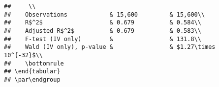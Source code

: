 \documentclass[
]{article}
\begin{document}
\begin{verbatim}
##     \\
##    Observations            & 15,600         & 15,600\\  
##    R$^2$                   & 0.679          & 0.584\\  
##    Adjusted R$^2$          & 0.679          & 0.583\\  
##    F-test (IV only)        &                & 131.8\\  
##    Wald (IV only), p-value &                & $1.27\times 10^{-32}$\\   
##    \bottomrule
## \end{tabular}
## \par\endgroup
\end{verbatim}
\end{document}

